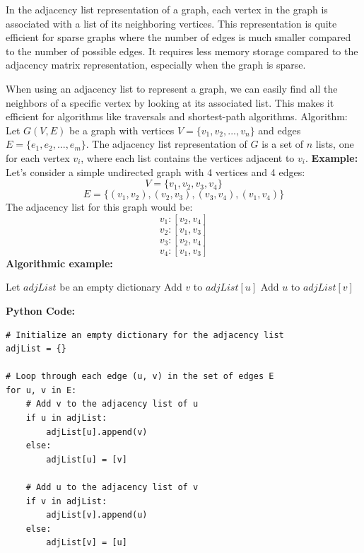 \documentclass[12pt]{book} %
\begin{document}
In the adjacency list representation of a graph, each vertex in the graph is associated with a list of its neighboring vertices. This representation is quite efficient for sparse graphs where the number of edges is much smaller compared to the number of possible edges. It requires less memory storage compared to the adjacency matrix representation, especially when the graph is sparse.

When using an adjacency list to represent a graph, we can easily find all the neighbors of a specific vertex by looking at its associated list. This makes it efficient for algorithms like traversals and shortest-path algorithms.
\FloatBarrier
Algorithm:
\FloatBarrier
Let \( G(V, E) \) be a graph with vertices \( V = \{v_1, v_2, ..., v_n\} \) and edges \( E = \{e_1, e_2, ..., e_m\} \). The adjacency list representation of \( G \) is a set of \( n \) lists, one for each vertex \( v_i \), where each list contains the vertices adjacent to \( v_i \).
\FloatBarrier
\textbf{Example:}
\FloatBarrier
Let's consider a simple undirected graph with 4 vertices and 4 edges:
\FloatBarrier
\[ V = \{v_1, v_2, v_3, v_4\} \]
\[ E = \{(v_1, v_2), (v_2, v_3), (v_3, v_4), (v_1, v_4)\} \]
\FloatBarrier
The adjacency list for this graph would be:
\FloatBarrier
\[ v_1: [v_2, v_4] \]
\[ v_2: [v_1, v_3] \]
\[ v_3: [v_2, v_4] \]
\[ v_4: [v_1, v_3] \]
\FloatBarrier
\textbf{Algorithmic example:}
\begin{algorithm}
\caption{Create Adjacency List of a Graph}
\begin{algorithmic}
\State Let $adjList$ be an empty dictionary
    \State Add $v$ to $adjList[u]$
    \State Add $u$ to $adjList[v]$
\EndFor
\end{algorithmic}
\end{algorithm}
\FloatBarrier
\textbf{Python Code:}
\FloatBarrier
\begin{verbatim}
# Initialize an empty dictionary for the adjacency list
adjList = {}

# Loop through each edge (u, v) in the set of edges E
for u, v in E:
    # Add v to the adjacency list of u
    if u in adjList:
        adjList[u].append(v)
    else:
        adjList[u] = [v]
    
    # Add u to the adjacency list of v
    if v in adjList:
        adjList[v].append(u)
    else:
        adjList[v] = [u]
\end{verbatim}
\FloatBarrier
\end{document}
